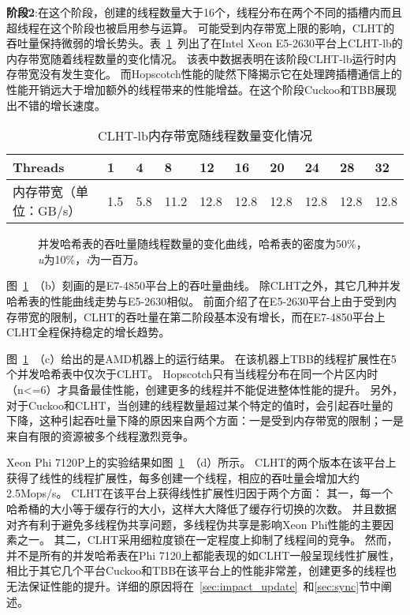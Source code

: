 \textbf{阶段2}:在这个阶段，创建的线程数量大于16个，线程分布在两个不同的插槽内而且超线程在这个阶段也被启用参与运算。
可能受到内存带宽上限的影响，CLHT的吞吐量保持微弱的增长势头。表~\ref{tab:mem_bandwidth}~列出了在Intel Xeon E5-2630平台上CLHT-lb的内存带宽随着线程数量的变化情况。
该表中数据表明在该阶段CLHT-lb运行时内存带宽没有发生变化。
而Hopscotch性能的陡然下降揭示它在处理跨插槽通信上的性能开销远大于增加额外的线程带来的性能增益。在这个阶段Cuckoo和TBB展现出不错的增长速度。

\begin{table}[htbp]
  \centering
  \caption{CLHT-lb内存带宽随线程数量变化情况}
  \label{tab:mem_bandwidth}
  \begin{tabular}{llllllllll}
    \toprule
       Threads & 1 & 4 & 8 & 12 & 16 & 20 & 24 & 28 & 32 \\
    \midrule
      内存带宽（单位：GB/s） & 1.5 & 5.8 & 11.2 & 12.8 & 12.8 & 12.8 & 12.8 & 12.8 & 12.8 \\ 
    \bottomrule
  \end{tabular}
\end{table}


\begin{figure}[htbp]
\centering
\caption{并发哈希表的吞吐量随线程数量的变化曲线，哈希表的密度为50\%，\textit{u}为10\%，\textit{i}为一百万。}
\label{fig:thread_scal}
\end{figure}

图~\ref{fig:thread_scal}~（b）刻画的是E7-4850平台上的吞吐量曲线。
除CLHT之外，其它几种并发哈希表的性能曲线走势与E5-2630相似。
前面介绍了在E5-2630平台上由于受到内存带宽的限制，CLHT的吞吐量在第二阶段基本没有增长，而在E7-4850平台上CLHT全程保持稳定的增长趋势。

图~\ref{fig:thread_scal}~（c）给出的是AMD机器上的运行结果。
在该机器上TBB的线程扩展性在5个并发哈希表中仅次于CLHT。
Hopscotch只有当线程分布在同一个片区内时（n<=6）才具备最佳性能，创建更多的线程并不能促进整体性能的提升。
另外，对于Cuckoo和CLHT，当创建的线程数量超过某个特定的值时，会引起吞吐量的下降，这种引起吞吐量下降的原因来自两个方面：一是受到内存带宽的限制；一是来自有限的资源被多个线程激烈竞争。

Xeon Phi 7120P上的实验结果如图~\ref{fig:thread_scal}~（d）所示。
CLHT的两个版本在该平台上获得了线性的线程扩展性，每多创建一个线程，相应的吞吐量会增加大约2.5Mops/s。 
CLHT在该平台上获得线性扩展性归因于两个方面：
其一，每一个哈希桶的大小等于缓存行的大小，这样大大降低了缓存行切换的次数。
并且数据对齐有利于避免多线程伪共享问题，多线程伪共享是影响Xeon Phi性能的主要因素之一。
其二，CLHT采用细粒度锁在一定程度上抑制了线程间的竞争。
然而，并不是所有的并发哈希表在Phi 7120上都能表现的如CLHT一般呈现线性扩展性，相比于其它几个平台Cuckoo和TBB在该平台上的性能非常差，创建更多的线程也无法保证性能的提升。详细的原因将在~\ref{sec:impact_update}~和\ref{sec:sync}节中阐述。

